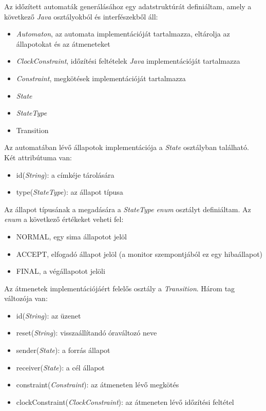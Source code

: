 Az időzített automaták generálásához egy adatstruktúrát definiáltam, amely a következő \textit{Java} osztályokból és interfészekből áll:
\begin{itemize}
    \item \textit{Automaton}, az automata implementációját tartalmazza, eltárolja az állapotokat és az átmeneteket
    \item \textit{ClockConstraint}, időzítési feltételek \textit{Java} implementációját tartalmazza
    \item \textit{Constraint}, megkötések implementációját tartalmazza
    \item \textit{State}
    \item \textit{StateType}
    \item Transition
\end{itemize}

Az automatában lévő állapotok implementációja a \textit{State} osztályban található.
Két attribútuma van:
\begin{itemize}
	\item id(\textit{String}): a címkéje tárolására
	\item type(\textit{StateType}): az állapot típusa
\end{itemize}

Az állapot típusának a megadására a \textit{StateType} \textit{enum} osztályt definiáltam.
Az \textit{enum} a következő értékeket veheti fel:
\begin{itemize}
	\item NORMAL, egy sima állapotot jelöl
	\item ACCEPT, elfogadó állapot jelöl (a monitor szempontjából ez egy hibaállapot)
	\item FINAL, a végállapotot jelöli
\end{itemize}

Az átmenetek implementációjáért felelős osztály a \textit{Transition}.
Három tag változója van:
\begin{itemize}
	\item id(\textit{String}): az üzenet
	\item reset(\textit{String}): visszaállítandó óraváltozó neve
	\item sender(\textit{State}): a forrás állapot
	\item receiver(\textit{State}): a cél állapot
	\item constraint(\textit{Constraint}): az átmeneten lévő megkötés
	\item clockConstraint(\textit{ClockConstraint}): az átmeneten lévő időzítési feltétel
\end{itemize}

